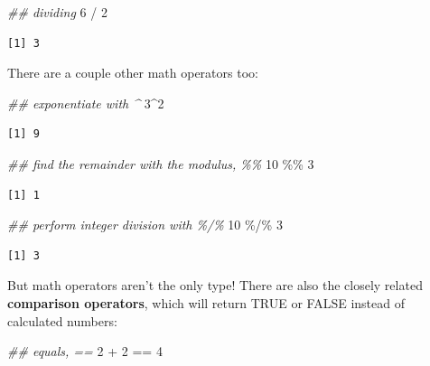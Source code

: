 \documentclass[
  letterpaper,
  DIV=11,
  numbers=noendperiod]{scrreprt}
\newenvironment{Shaded}{\begin{snugshade}}{\end{snugshade}}
\newcommand{\DecValTok}[1]{\textcolor[rgb]{0.68,0.00,0.00}{#1}}
\newcommand{\DocumentationTok}[1]{\textcolor[rgb]{0.37,0.37,0.37}{\textit{#1}}}
\newcommand{\SpecialCharTok}[1]{\textcolor[rgb]{0.37,0.37,0.37}{#1}}
\begin{document}
\begin{Shaded}
\begin{Highlighting}[]
\DocumentationTok{\#\# dividing}
\DecValTok{6} \SpecialCharTok{/} \DecValTok{2}
\end{Highlighting}
\end{Shaded}

\begin{verbatim}
[1] 3
\end{verbatim}

There are a couple other math operators too:

\begin{Shaded}
\begin{Highlighting}[]
\DocumentationTok{\#\# exponentiate with \^{}}
\DecValTok{3}\SpecialCharTok{\^{}}\DecValTok{2}
\end{Highlighting}
\end{Shaded}

\begin{verbatim}
[1] 9
\end{verbatim}

\begin{Shaded}
\begin{Highlighting}[]
\DocumentationTok{\#\# find the remainder with the modulus, \%\%}
\DecValTok{10} \SpecialCharTok{\%\%} \DecValTok{3}
\end{Highlighting}
\end{Shaded}

\begin{verbatim}
[1] 1
\end{verbatim}

\begin{Shaded}
\begin{Highlighting}[]
\DocumentationTok{\#\# perform integer division with \%/\%}
\DecValTok{10} \SpecialCharTok{\%/\%} \DecValTok{3}
\end{Highlighting}
\end{Shaded}

\begin{verbatim}
[1] 3
\end{verbatim}

But math operators aren't the only type! There are also the closely
related \textbf{comparison operators}, which will return TRUE or FALSE
instead of calculated numbers:

\begin{Shaded}
\begin{Highlighting}[]
\DocumentationTok{\#\# equals, ==}
\DecValTok{2} \SpecialCharTok{+} \DecValTok{2} \SpecialCharTok{==} \DecValTok{4}
\end{Highlighting}
\end{Shaded}
\end{document}
